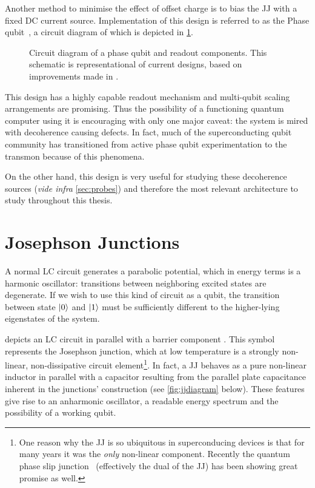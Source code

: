 Another method to minimise the effect of offset charge is to bias the JJ with a fixed DC current source.
Implementation of this design is referred to as the Phase qubit~\cite{Clarke1988,Martinis2002}, a circuit diagram of which is depicted in \cref{fig:qubit}.

\begin{figure}[htp]
\resizebox{0.75\textwidth}{!}{}
\caption[Phase Qubit Circuit Diagram]{\label{fig:qubit}Circuit diagram of a phase qubit and readout components. This schematic is representational of current designs, based on improvements made in .}
\end{figure}

This design has a highly capable readout mechanism and multi-qubit scaling arrangements are promising.
Thus the possibility of a functioning quantum computer using it is encouraging with only one major caveat: the system is mired with decoherence causing defects.
In fact, much of the superconducting qubit community has transitioned from active phase qubit experimentation to the transmon because of this phenomena.

On the other hand, this design is very useful for studying these decoherence sources (\textit{vide infra} \cref{sec:probes}) and therefore the most relevant architecture to study throughout this thesis.

\section{Josephson Junctions}
A normal LC circuit generates a parabolic potential, which in energy terms is a harmonic oscillator: transitions between neighboring excited states are degenerate.
If we wish to use this kind of circuit as a qubit, the transition between state $\lvert0\rangle$ and $\lvert1\rangle$ must be sufficiently different to the higher-lying eigenstates of the system.

 depicts an LC circuit in parallel with a barrier component  \resizebox{!}{0.6em}{}.
This symbol represents the Josephson junction, which at low temperature is a strongly non-linear, non-dissipative circuit element\footnote{One reason why the JJ is so ubiquitous in superconducing devices is that for many years it was the \textit{only} non-linear component. Recently the quantum phase slip junction~\cite{Bezryadin2000,Mooij2006,Astafiev2012} (effectively the dual of the JJ) has been showing great promise as well.}.
In fact, a JJ behaves as a pure non-linear inductor in parallel with a capacitor resulting from the parallel plate capacitance inherent in the junctions' construction (see \cref{fig:jjdiagram} below).
These features give rise to an anharmonic oscillator, a readable energy spectrum and the possibility of a working qubit.

